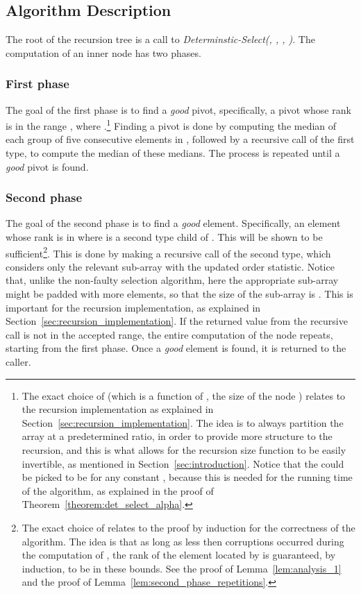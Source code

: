 \documentclass{llncs}
\begin{document}
\subsection{Algorithm Description}

The root of the recursion tree is a call to \emph{Determinstic-Select(, , , )}.
The computation of an inner node  has two phases.









\subsubsection{First phase}

The goal of the first phase is to find a \emph{good} pivot, specifically, a pivot whose rank is in the range , where .\footnote{The exact choice of  (which is a function of , the size of the node ) relates to the recursion implementation as explained in Section~\ref{sec:recursion_implementation}. The idea is to always partition the array at a predetermined ratio, in order to provide more structure to the recursion, and this is what allows for the recursion size function to be easily invertible, as mentioned in Section~\ref{sec:introduction}. Notice that the  could be picked to be  for any constant , because this is needed for the running time of the algorithm, as explained in the proof of Theorem~\ref{theorem:det_select_alpha}.} Finding a pivot is done by computing the median of each group of five consecutive elements in , followed by a recursive call of the first type, to compute the median of these medians. The process is repeated until a \emph{good} pivot is found.

\subsubsection{Second phase}

The goal of the second phase is to find a \emph{good} element. Specifically, an element whose rank is in  where  is a second type child of . This will be shown to be sufficient\footnote{The exact choice of  relates to the proof by induction for the correctness of the algorithm. The idea is that as long as less then  corruptions occurred during the computation of , the rank of the element located by  is guaranteed, by induction, to be in these bounds. See the proof of Lemma~\ref{lem:analysis_1} and the proof of Lemma~\ref{lem:second_phase_repetitions}.}. This is done by making a recursive call of the second type, which considers only the relevant sub-array with the updated order statistic. Notice that, unlike the non-faulty selection algorithm, here the appropriate sub-array might be padded with more elements, so that the size of the sub-array is . This is important for the recursion implementation, as explained in Section~\ref{sec:recursion_implementation}. If the returned value from the recursive call is not in the accepted range, the entire computation of the node repeats, starting from the first phase. Once a \emph{good} element is found, it is returned to the caller.
\end{document}
